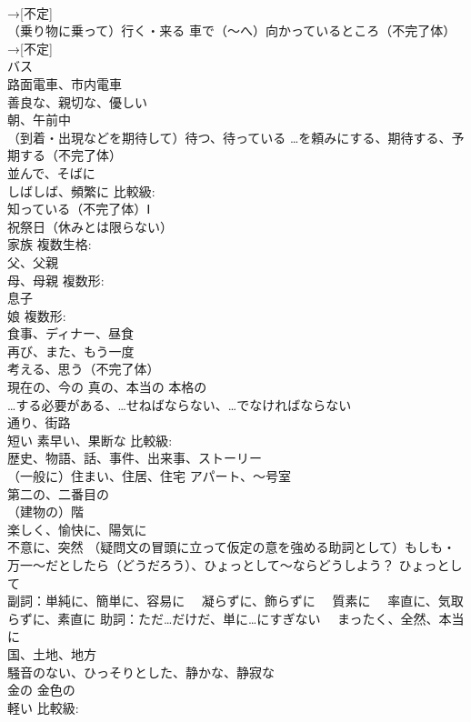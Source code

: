 \documentclass[8pt]{extreport}
\begin{document}
\begin{CJK}{UTF8}{min}
\\	→[不定] 
\\	[定]（乗り物に乗って）行く・来る 車で（～へ）向かっているところ（不完了体） 
\\	→[不定]
\\	バス
\\	路面電車、市内電車
\\	善良な、親切な、優しい
\\	朝、午前中
\\	[…を／生格・対格]（到着・出現などを期待して）待つ、待っている …を頼みにする、期待する、予期する（不完了体） 
\\	並んで、そばに
\\	しばしば、頻繁に 比較級:
\\	知っている（不完了体）Ⅰ
\\	祝祭日（休みとは限らない）
\\	家族 複数生格:
\\	父、父親
\\	母、母親 複数形:
\\	息子
\\	娘 複数形:
\\	食事、ディナー、昼食
\\	再び、また、もう一度
\\	考える、思う（不完了体）
\\	現在の、今の 真の、本当の 本格の
\\	[無人述]…する必要がある、…せねばならない、…でなければならない
\\	通り、街路
\\	短い 素早い、果断な 比較級:
\\	歴史、物語、話、事件、出来事、ストーリー
\\	（一般に）住まい、住居、住宅 アパート、〜号室
\\	[序]第二の、二番目の
\\	（建物の）階
\\	楽しく、愉快に、陽気に
\\	不意に、突然 （疑問文の冒頭に立って仮定の意を強める助詞として）もしも・万一〜だとしたら（どうだろう）、ひょっとして〜ならどうしよう？ ひょっとして
\\	副詞：単純に、簡単に、容易に 　凝らずに、飾らずに 　質素に 　率直に、気取らずに、素直に 助詞：ただ…だけだ、単に…にすぎない 　まったく、全然、本当に
\\	国、土地、地方
\\	騒音のない、ひっそりとした、静かな、静寂な
\\	金の 金色の
\\	軽い 比較級:

\end{CJK}
\end{document}

